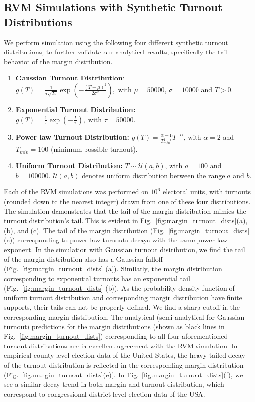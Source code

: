 \subsection{RVM Simulations with Synthetic Turnout Distributions}
We perform simulation using the following four different synthetic turnout distributions, to further validate our analytical results, specifically the tail behavior of the margin distribution.
\begin{enumerate}
    \item \textbf{Gaussian Turnout Distribution:} $g(T) = \frac{1}{\sigma\sqrt{2\pi}}\exp\left(-\frac{(T - \mu)^2}{2\sigma^2}\right), \text{ with } \mu = 50000$, $\sigma = 10000$ and $T > 0$.
    \item \textbf{Exponential Turnout Distribution:} $g(T) = \frac{1}{\tau} \exp{\left(-\frac{T}{\tau}\right)}, \text{ with } \tau = 50000$.
    \item \textbf{Power law Turnout Distribution:} $g(T) = \frac{\alpha - 1}{T_{min} ^{1 -\alpha}} T ^ {-\alpha}$, with $\alpha = 2$ and $T_{min} = 100$ (minimum possible turnout).
    \item \textbf{Uniform Turnout Distribution:} $T \sim \mathcal{U} (a, b)$, with $a = 100$ and $b = 100000$. $\mathcal{U}(a, b)$ denotes uniform distribution between the range $a$ and $b$.
\end{enumerate}

Each of the RVM simulations was performed on $10^6$ electoral units, with turnouts (rounded down to the nearest integer) drawn from one of these four distributions. The simulation demonstrates that the tail of the margin distribution mimics the turnout distribution's tail.  This is evident in Fig.~\ref{fig:margin_turnout_dists}(a), (b), and (c). The tail of the margin distribution (Fig.~\ref{fig:margin_turnout_dists} (c)) corresponding to power law turnouts decays with the same power law exponent.  In the simulation with Gaussian turnout distribution, we find the tail of the margin distribution also has a Gaussian falloff (Fig.~\ref{fig:margin_turnout_dists} (a)). Similarly, the margin distribution corresponding to exponential turnouts has an exponential tail (Fig.~\ref{fig:margin_turnout_dists} (b)). As the probability density function of uniform turnout distribution and corresponding margin distribution have finite supports, their tails can not be properly defined. We find a sharp cutoff in the corresponding margin distribution. The analytical (semi-analytical for Gaussian turnout) predictions for the margin distributions (shown as black lines in Fig.~\ref{fig:margin_turnout_dists}) corresponding to all four aforementioned turnout distributions are in excellent agreement with the RVM simulation. In empirical county-level election data of the United States, the heavy-tailed decay of the turnout distribution is reflected in the corresponding margin distribution (Fig.~\ref{fig:margin_turnout_dists}(e)). In Fig.~\ref{fig:margin_turnout_dists}(f), we see a similar decay trend in both margin and turnout distribution, which correspond to congressional district-level election data of the USA. 


